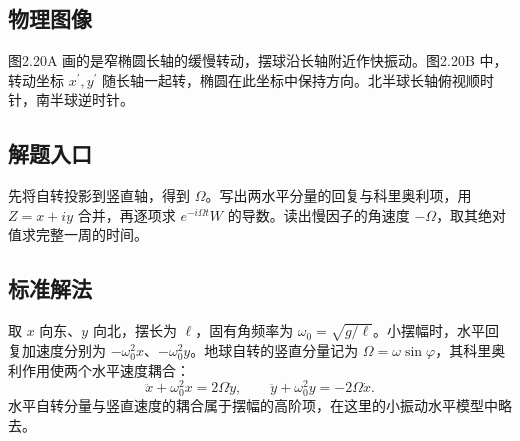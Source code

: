 \documentclass[UTF8,fontset=fandol,a4paper,11pt]{ctexart}
\begin{document}


\subsection*{物理图像}

图2.20A 画的是窄椭圆长轴的缓慢转动，摆球沿长轴附近作快振动。图2.20B 中，转动坐标 $x^{\prime},y^{\prime}$ 随长轴一起转，椭圆在此坐标中保持方向。北半球长轴俯视顺时针，南半球逆时针。



\subsection*{解题入口}

先将自转投影到竖直轴，得到 $\Omega$。写出两水平分量的回复与科里奥利项，用 $Z=x+iy$ 合并，再逐项求 $e^{-i\Omega t}W$ 的导数。读出慢因子的角速度 $-\Omega$，取其绝对值求完整一周的时间。



\subsection*{标准解法}

取 $x$ 向东、$y$ 向北，摆长为 $\ell$，固有角频率为 $\omega_0=\sqrt{g/\ell}$。小摆幅时，水平回复加速度分别为 $-\omega_0^2x$、$-\omega_0^2y$。地球自转的竖直分量记为 $\Omega=\omega\sin\varphi$，其科里奥利作用使两个水平速度耦合：
\[
\ddot x+\omega_0^2x=2\Omega\dot y,
\qquad\ddot y+\omega_0^2y=-2\Omega\dot x.
\]
水平自转分量与竖直速度的耦合属于摆幅的高阶项，在这里的小振动水平模型中略去。
\end{document}
